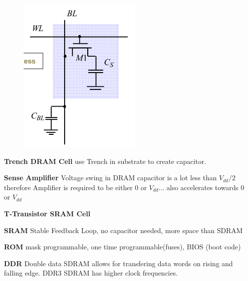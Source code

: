 \documentclass[english]{latex4ei/latex4ei_sheet}
\begin{document}
\begin{figure}
    \centering
    \includegraphics[width=1\linewidth]{images//5.Memory/DRAMCell.png}
\end{figure}

\textbf{Trench DRAM Cell} use Trench in substrate to create capacitor. 

\textbf{Sense Amplifier} Voltage swing in DRAM capacitor is a lot less than $V_{dd} / 2$ therefore Amplifier is required to be either 0 or $V_{dd}$... also accelerates towards 0 or $V_{dd}$

\textbf{T-Transistor SRAM Cell}

\textbf{SRAM} Stable Feedback Loop, no capacitor needed, more space than SDRAM

\textbf{ROM} mask programmable, one time programmable(fuses), BIOS (boot code)

\textbf{DDR} Double data SDRAM allows for transfering data words on rising and falling edge. DDR3 SDRAM has higher clock frequencies.
\end{document}
